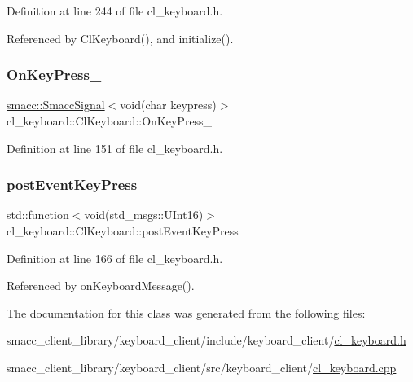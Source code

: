 Definition at line 244 of file cl\+\_\+keyboard.\+h.



Referenced by Cl\+Keyboard(), and initialize().

\mbox{\label{classcl__keyboard_1_1ClKeyboard_ae7fb61a86ed9cdd313f0cc1b2661c63c}} 
\subsubsection{\texorpdfstring{On\+Key\+Press\+\_\+}{OnKeyPress\_}}
{\footnotesize\ttfamily \hyperlink{classsmacc_1_1SmaccSignal}{smacc\+::\+Smacc\+Signal}$<$void(char keypress)$>$ cl\+\_\+keyboard\+::\+Cl\+Keyboard\+::\+On\+Key\+Press\+\_\+}



Definition at line 151 of file cl\+\_\+keyboard.\+h.

\mbox{\label{classcl__keyboard_1_1ClKeyboard_ae9811fd50207ba9b69a4f27e7f8b4e86}} 
\subsubsection{\texorpdfstring{post\+Event\+Key\+Press}{postEventKeyPress}}
{\footnotesize\ttfamily std\+::function$<$void(std\+\_\+msgs\+::\+U\+Int16)$>$ cl\+\_\+keyboard\+::\+Cl\+Keyboard\+::post\+Event\+Key\+Press}



Definition at line 166 of file cl\+\_\+keyboard.\+h.



Referenced by on\+Keyboard\+Message().



The documentation for this class was generated from the following files\+:\begin{DoxyCompactItemize}
\item 
smacc\+\_\+client\+\_\+library/keyboard\+\_\+client/include/keyboard\+\_\+client/\hyperlink{cl__keyboard_8h}{cl\+\_\+keyboard.\+h}\item 
smacc\+\_\+client\+\_\+library/keyboard\+\_\+client/src/keyboard\+\_\+client/\hyperlink{cl__keyboard_8cpp}{cl\+\_\+keyboard.\+cpp}\end{DoxyCompactItemize}
